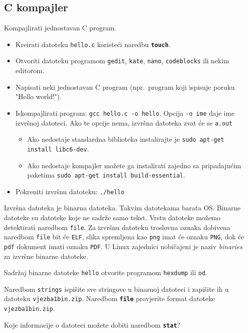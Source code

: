\subsection*{C kompajler}
\begin{zadatak}
Kompajlirati jednostavan C program. 
\begin{itemize}
 \item Kreirati datoteku \texttt{hello.c} koristeći naredbu \textbf{\texttt{touch}}.
 \item Otvoriti datoteku programom \texttt{gedit}, \texttt{kate}, \texttt{nano}, \texttt{codeblocks} ili nekim editorom.
 \item Napisati neki jednostavan C program (npr.~program koji ispisuje poruku "Hello world!").
\item Iskompajlirati program: \texttt{gcc hello.c -o hello}. Opcija \lstinline!-o ime! daje ime izvršnoj datoteci. Ako te opcije nema, izvršna datoteka zvat će se \lstinline!a.out! 
\begin{itemize}
\item Ako nedostaje standardna biblioteka instalirajte je \texttt{sudo apt-get install libc6-dev}.
\item Ako nedostaje kompajler možete ga instalirati zajedno  sa pripadajućim paketima \texttt{sudo apt-get install build-essential}.                                                                                                                                                                                                                                                                                    \end{itemize}
\item Pokreniti izvršnu datoteku: \texttt{./hello}
\end{itemize}
\end{zadatak}

Izvršna datoteka je binarna datoteka. Takvim datotekama barata OS. Binarne datoteke su datoteke koje ne sadrže samo tekst. Vrstu datoteke možemo detektirati naredbom \lstinline!file!. Za izvršnu datoteku troslovna oznaka dobivena naredbom \lstinline!file! bit će \lstinline!ELF!, slika spremljena kao \lstinline!png! imat će oznaku \lstinline!PNG!, dok će \lstinline!pdf! dokument imati oznaku \lstinline!PDF!. U Linux zajednici uobičajeni je naziv \textit{binaries} za izvršne binarne datoteke. 
\begin{zadatak}
Sadržaj binarne datoteke \texttt{hello} otvorite programom \texttt{hexdump} ili \texttt{od}.
\end{zadatak}
\begin{zadatak}
Naredbom \texttt{strings} ispišite sve stringove u binarnoj datoteci i zapišite ih u datoteku \texttt{vjezba1bin.zip}. Naredbom \textbf{\texttt{file}} provjerite format datoteke \texttt{vjezba1bin.zip}. 
\end{zadatak}
\begin{zadatak}
Koje informacije o datoteci možete dobiti naredbom \textbf{\texttt{stat}}?
\end{zadatak}

